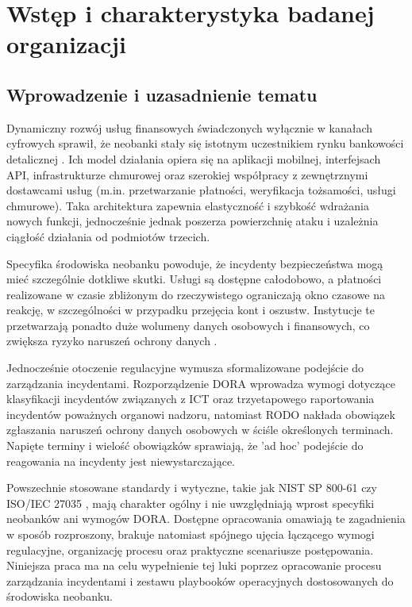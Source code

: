 \chapter{Wstęp i charakterystyka badanej organizacji}\label{ch:wstep}

\section{Wprowadzenie i uzasadnienie tematu}\label{sec:wprowadzenie}
Dynamiczny rozwój usług finansowych świadczonych wyłącznie w kanałach cyfrowych sprawił, że neobanki stały się istotnym uczestnikiem rynku bankowości detalicznej \cite{specjalisci2025}. Ich model działania opiera się na aplikacji mobilnej, interfejsach API, infrastrukturze chmurowej oraz szerokiej współpracy z zewnętrznymi dostawcami usług (m.in. przetwarzanie płatności, weryfikacja tożsamości, usługi chmurowe). Taka architektura zapewnia elastyczność i szybkość wdrażania nowych funkcji, jednocześnie jednak poszerza powierzchnię ataku i uzależnia ciągłość działania od podmiotów trzecich.

Specyfika środowiska neobanku powoduje, że incydenty bezpieczeństwa mogą mieć szczególnie dotkliwe skutki. Usługi są dostępne całodobowo, a płatności realizowane w czasie zbliżonym do rzeczywistego ograniczają okno czasowe na reakcję, w szczególności w przypadku przejęcia kont i oszustw. Instytucje te przetwarzają ponadto duże wolumeny danych osobowych i finansowych, co zwiększa ryzyko naruszeń ochrony danych \cite{pymnts2026fraud}.

Jednocześnie otoczenie regulacyjne wymusza sformalizowane podejście do zarządzania incydentami. Rozporządzenie DORA \cite{dora2022} wprowadza wymogi dotyczące klasyfikacji incydentów związanych z ICT oraz trzyetapowego raportowania incydentów poważnych organowi nadzoru, natomiast RODO \cite{rodo2016} nakłada obowiązek zgłaszania naruszeń ochrony danych osobowych w ściśle określonych terminach. Napięte terminy i wielość obowiązków sprawiają, że 'ad hoc' podejście do reagowania na incydenty jest niewystarczające.

Powszechnie stosowane standardy i wytyczne, takie jak NIST SP 800-61 \cite{nist800-61r2} czy ISO/IEC 27035 \cite{iso27035-2}, mają charakter ogólny i nie uwzględniają wprost specyfiki neobanków ani wymogów DORA. Dostępne opracowania omawiają te zagadnienia w sposób rozproszony, brakuje natomiast spójnego ujęcia łączącego wymogi regulacyjne, organizację procesu oraz praktyczne scenariusze postępowania. Niniejsza praca ma na celu wypełnienie tej luki poprzez opracowanie procesu zarządzania incydentami i zestawu playbooków operacyjnych dostosowanych do środowiska neobanku.

